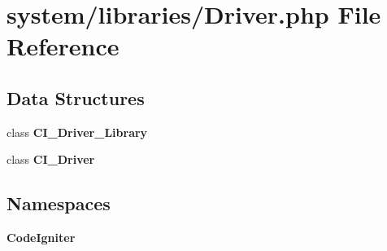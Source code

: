 \section{system/libraries/\-Driver.php File Reference}
\label{_driver_8php}
\subsection*{Data Structures}
\begin{DoxyCompactItemize}
\item 
class {\bf C\-I\-\_\-\-Driver\-\_\-\-Library}
\item 
class {\bf C\-I\-\_\-\-Driver}
\end{DoxyCompactItemize}
\subsection*{Namespaces}
\begin{DoxyCompactItemize}
\item 
{\bf Code\-Igniter}
\end{DoxyCompactItemize}
